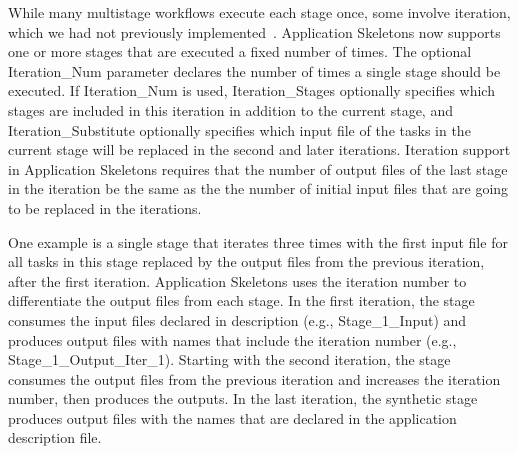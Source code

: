 \documentclass[preprint,12pt]{elsarticle}
\newcommand{\katznote}[1]{ {\textcolor{blue}    { ***Dan:   #1 }}}
\newcommand{\zhaonote}[1]{{\textcolor{cyan}{ ***Zhao:  #1 }}}
\newcommand{\katznote}[1]{}
\newcommand{\zhaonote}[1]{}
\begin{document}

While many multistage workflows execute 
each stage once, some involve iteration, which we had not previously implemented~\cite{Skeleton2013}. Application Skeletons now supports one or more stages that are executed a fixed number of times. 
The optional Iteration\_Num parameter declares the number of times a single stage should be executed.
If Iteration\_Num is used, Iteration\_Stages optionally specifies which stages are included in this iteration in addition to the current stage, and
Iteration\_Substitute optionally specifies which input file of the tasks in the current stage will be replaced in the second and later iterations.
%
Iteration support in Application Skeletons requires that the number of output files of the last
stage in the iteration be the same as the the number of initial input files that are going to be replaced in the iterations.

One example is a single stage that iterates three times with the 
first input file for all tasks in this stage replaced by the output files from the previous iteration, after the first iteration. Application Skeletons uses the iteration 
number to differentiate the output files from each stage. In the first iteration, the stage consumes the input files
declared in description (e.g., Stage\_1\_Input) and produces output files with names that include the iteration 
number (e.g., Stage\_1\_Output\_Iter\_1). Starting with the second iteration, the stage consumes the output files from the previous
iteration and increases the iteration number, then produces the outputs. In the last iteration,
the synthetic stage produces output files with the names that are declared in the application description file.
\end{document}
